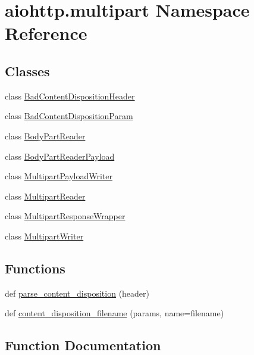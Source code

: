 \hypertarget{namespaceaiohttp_1_1multipart}{}\section{aiohttp.\+multipart Namespace Reference}
\label{namespaceaiohttp_1_1multipart}
\subsection*{Classes}
\begin{DoxyCompactItemize}
\item 
class \hyperlink{classaiohttp_1_1multipart_1_1_bad_content_disposition_header}{Bad\+Content\+Disposition\+Header}
\item 
class \hyperlink{classaiohttp_1_1multipart_1_1_bad_content_disposition_param}{Bad\+Content\+Disposition\+Param}
\item 
class \hyperlink{classaiohttp_1_1multipart_1_1_body_part_reader}{Body\+Part\+Reader}
\item 
class \hyperlink{classaiohttp_1_1multipart_1_1_body_part_reader_payload}{Body\+Part\+Reader\+Payload}
\item 
class \hyperlink{classaiohttp_1_1multipart_1_1_multipart_payload_writer}{Multipart\+Payload\+Writer}
\item 
class \hyperlink{classaiohttp_1_1multipart_1_1_multipart_reader}{Multipart\+Reader}
\item 
class \hyperlink{classaiohttp_1_1multipart_1_1_multipart_response_wrapper}{Multipart\+Response\+Wrapper}
\item 
class \hyperlink{classaiohttp_1_1multipart_1_1_multipart_writer}{Multipart\+Writer}
\end{DoxyCompactItemize}
\subsection*{Functions}
\begin{DoxyCompactItemize}
\item 
def \hyperlink{namespaceaiohttp_1_1multipart_a49b6573a2d732ccf8a5c491d003b60bc}{parse\+\_\+content\+\_\+disposition} (header)
\item 
def \hyperlink{namespaceaiohttp_1_1multipart_ae920aaa11fe782dddf905c5fbc387df6}{content\+\_\+disposition\+\_\+filename} (params, name=\textquotesingle{}filename\textquotesingle{})
\end{DoxyCompactItemize}


\subsection{Function Documentation}
\mbox{\label{namespaceaiohttp_1_1multipart_ae920aaa11fe782dddf905c5fbc387df6}} 
